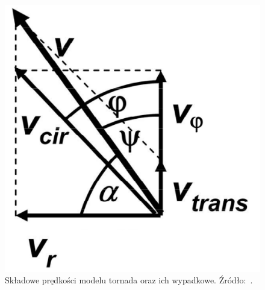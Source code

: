 \begin{figure}[!h]
	\center
	\includegraphics[scale=0.45]{rankine2}
	\caption{Składowe prędkości modelu tornada oraz ich wypadkowe. Źródło:~\cite{dpfh_model}.}
	\label{fig:rankine2}
\end{figure} 
